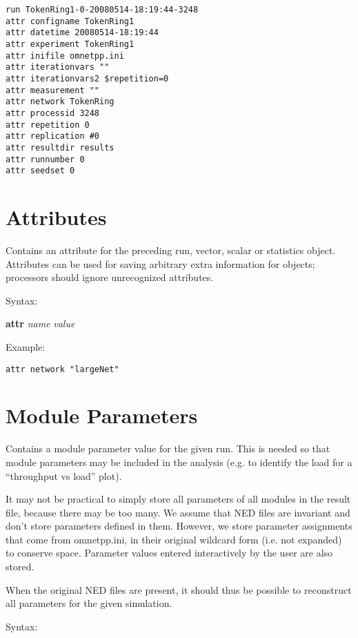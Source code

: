 \begin{verbatim}
run TokenRing1-0-20080514-18:19:44-3248
attr configname TokenRing1
attr datetime 20080514-18:19:44
attr experiment TokenRing1
attr inifile omnetpp.ini
attr iterationvars ""
attr iterationvars2 $repetition=0
attr measurement ""
attr network TokenRing
attr processid 3248
attr repetition 0
attr replication #0
attr resultdir results
attr runnumber 0
attr seedset 0
\end{verbatim}



\section{Attributes}

Contains an attribute for the preceding run, vector, scalar or
statistics object. Attributes can be used for saving arbitrary
extra information for objects; processors should ignore unrecognized
attributes.

Syntax:

\hspace{20mm} \textbf{attr} \textit{name} \textit{value}

Example:

\begin{verbatim}
attr network "largeNet"
\end{verbatim}



\section{Module Parameters}

Contains a module parameter value for the given run. This is needed so
that module parameters may be included in the analysis (e.g. to
identify the load for a ``throughput vs load'' plot).

It may not be practical to simply store all parameters of all modules in the
result file, because there may be too many. We assume that NED files are
invariant and don't store parameters defined in them. However, we store
parameter assignments that come from omnetpp.ini, in their original
wildcard form (i.e. not expanded) to conserve space. Parameter values
entered interactively by the user are also stored.

When the original NED files are present, it should thus be possible to
reconstruct all parameters for the given simulation.

Syntax:

